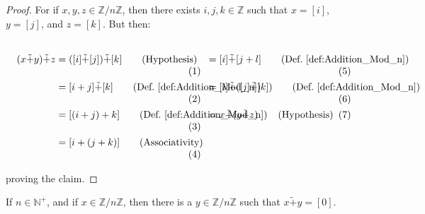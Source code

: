 \documentclass{article}                                                        %
\begin{document}
            \begin{proof}
                For if $x,y,z\in\mathbb{Z}/n\mathbb{Z}$, then there exists
                $i,j,k\in\mathbb{Z}$ such that $x=[i]$, $y=[j]$, and $z=[k]$.
                But then:
                \par
                \begin{subequations}
                    \begin{minipage}[t]{0.54\textwidth}
                        \centering
                        \begin{align}
                            (x\tilde{+}y)\tilde{+}z
                            &=([i]\tilde{+}[j])\tilde{+}[k]
                                \tag{Hypothesis}\\
                            &=[i+j]\tilde{+}[k]
                                \tag{Def.~\ref{def:Addition_Mod_n}}\\
                            &=[(i+j)+k]
                                \tag{Def.~\ref{def:Addition_Mod_n}}\\
                            &=[i+(j+k)]
                                \tag{Associativity}
                        \end{align}
                    \end{minipage}
                    \hfill
                    \begin{minipage}[t]{0.44\textwidth}
                        \begin{align}
                            &=[i]\tilde{+}[j+l]
                                \tag{Def.~\ref{def:Addition_Mod_n}}\\
                            &=[i]\tilde{+}([j]\tilde{+}[k])
                                \tag{Def.~\ref{def:Addition_Mod_n}}\\
                            &=x\tilde{+}(y\tilde{+}z)
                                \tag{Hypothesis}
                        \end{align}
                    \end{minipage}
                \end{subequations}
                \par\vspace{2.5ex}
                proving the claim.
            \end{proof}
            \begin{theorem}
                \label{thm:Additive_Inv_Mod_n}%
                If $n\in\mathbb{N}^{+}$, and if $x\in\mathbb{Z}/n\mathbb{Z}$,
                then there is a $y\in\mathbb{Z}/n\mathbb{Z}$ such that
                $x\tilde{+}y=[0]$.
            \end{theorem}
\end{document}
